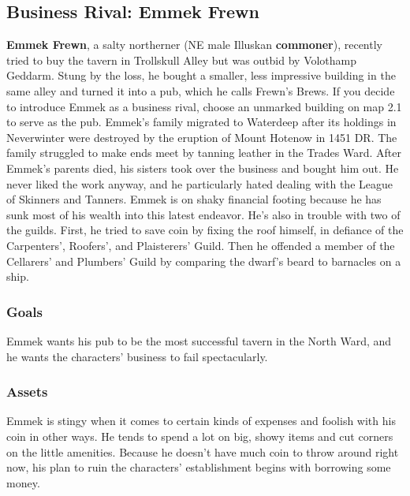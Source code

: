 \documentclass[10pt,a4paper,twoside,twocolumn,openany,nodeprecatedcode]{dndbook}
\begin{document}
\subsection{Business Rival: Emmek Frewn}
\textbf{Emmek Frewn}, a salty northerner (NE male Illuskan \textbf{commoner}), recently tried to buy the tavern in Trollskull Alley but was outbid by Volothamp Geddarm. Stung by the loss, he bought a smaller, less impressive building in the same alley and turned it into a pub, which he calls Frewn's Brews. If you decide to introduce Emmek as a business rival, choose an unmarked building on map 2.1 to serve as the pub.
Emmek's family migrated to Waterdeep after its holdings in Neverwinter were destroyed by the eruption of Mount Hotenow in 1451 DR. The family struggled to make ends meet by tanning leather in the Trades Ward. After Emmek's parents died, his sisters took over the business and bought him out. He never liked the work anyway, and he particularly hated dealing with the League of Skinners and Tanners.
Emmek is on shaky financial footing because he has sunk most of his wealth into this latest endeavor. He's also in trouble with two of the guilds. First, he tried to save coin by fixing the roof himself, in defiance of the Carpenters', Roofers', and Plaisterers' Guild. Then he offended a member of the Cellarers' and Plumbers' Guild by comparing the dwarf's beard to barnacles on a ship.
\subsubsection{Goals}
Emmek wants his pub to be the most successful tavern in the North Ward, and he wants the characters' business to fail spectacularly.
\subsubsection{Assets}
Emmek is stingy when it comes to certain kinds of expenses and foolish with his coin in other ways. He tends to spend a lot on big, showy items and cut corners on the little amenities. Because he doesn't have much coin to throw around right now, his plan to ruin the characters' establishment begins with borrowing some money.
\end{document}

